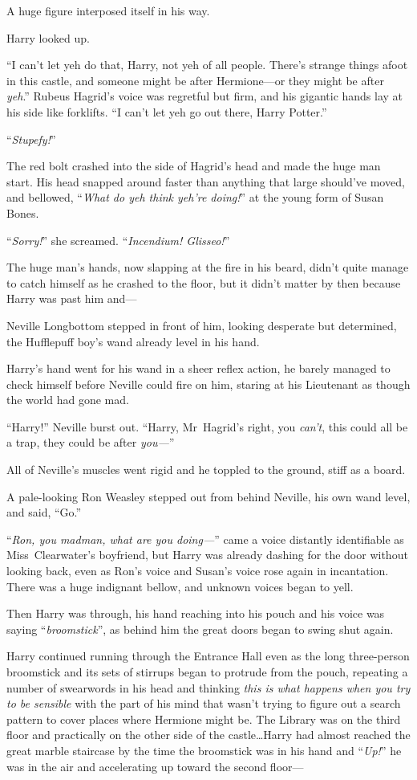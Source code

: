 A huge figure interposed itself in his way.

Harry looked up.

“I can’t let yeh do that, Harry, not yeh of all people. There’s strange things afoot in this castle, and someone might be after Hermione—or they might be after \emph{yeh}.” Rubeus Hagrid’s voice was regretful but firm, and his gigantic hands lay at his side like forklifts. “I can’t let yeh go out there, Harry Potter.”

“\emph{Stupefy!}”

The red bolt crashed into the side of Hagrid’s head and made the huge man start. His head snapped around faster than anything that large should’ve moved, and bellowed, “\emph{What do yeh think yeh’re doing!}” at the young form of Susan Bones.

“\emph{Sorry!}” she screamed. “\emph{Incendium! Glisseo!}”

The huge man’s hands, now slapping at the fire in his beard, didn’t quite manage to catch himself as he crashed to the floor, but it didn’t matter by then because Harry was past him and—

Neville Longbottom stepped in front of him, looking desperate but determined, the Hufflepuff boy’s wand already level in his hand.

Harry’s hand went for his wand in a sheer reflex action, he barely managed to check himself before Neville could fire on him, staring at his Lieutenant as though the world had gone mad.

“Harry!” Neville burst out. “Harry, Mr~Hagrid’s right, you \emph{can’t}, this could all be a trap, they could be after \emph{you—}”

All of Neville’s muscles went rigid and he toppled to the ground, stiff as a board.

A pale-looking Ron Weasley stepped out from behind Neville, his own wand level, and said, “Go.”

“\emph{Ron, you madman, what are you doing—}” came a voice distantly identifiable as Miss~Clearwater’s boyfriend, but Harry was already dashing for the door without looking back, even as Ron’s voice and Susan’s voice rose again in incantation. There was a huge indignant bellow, and unknown voices began to yell.

Then Harry was through, his hand reaching into his pouch and his voice was saying “\emph{broomstick}”, as behind him the great doors began to swing shut again.

Harry continued running through the Entrance Hall even as the long three-person broomstick and its sets of stirrups began to protrude from the pouch, repeating a number of swearwords in his head and thinking \emph{this is what happens when you try to be sensible} with the part of his mind that wasn’t trying to figure out a search pattern to cover places where Hermione might be. The Library was on the third floor and practically on the other side of the castle…Harry had almost reached the great marble staircase by the time the broomstick was in his hand and “\emph{Up!}” he was in the air and accelerating up toward the second floor—

